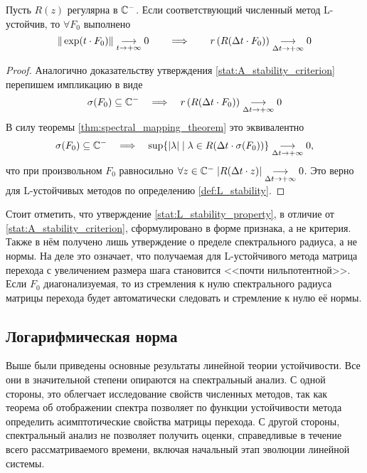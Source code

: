 \begin{statement}
    \label{stat:L_stability_property}
    Пусть $ R(z) $ регулярна в $ \mathbb{C}^- $.
    Если соответствующий численный метод L-устойчив, то $ \forall F_0 $ выполнено
    \[
        \| \exp(t \cdot F_0) \| \underset{t \to +\infty}{\longrightarrow} 0 \qquad \Longrightarrow \qquad r \left( R(\Delta t \cdot F_0) \right) \underset{\Delta t \to +\infty}{\longrightarrow} 0
    \]
\end{statement}

\begin{proof}
    Аналогично доказательству утверждения \ref{stat:A_stability_criterion} перепишем импликацию в виде
    \[
        \sigma(F_0) \subseteq \mathbb{C}^- \quad \Longrightarrow \quad r \left( R(\Delta t \cdot F_0) \right) \underset{\Delta t \to +\infty}{\longrightarrow} 0
    \]
    В силу теоремы \ref{thm:spectral_mapping_theorem} это эквивалентно
    \[
        \sigma(F_0) \subseteq \mathbb{C}^- \quad \Longrightarrow \quad \sup \{ |\lambda| \mid \lambda \in R(\Delta t \cdot \sigma(F_0)) \} \underset{\Delta t \to +\infty}{\longrightarrow} 0,
    \]
    что при произвольном $ F_0 $ равносильно $ \forall z \in \mathbb{C}^- \; | R(\Delta t \cdot z) | \underset{\Delta t \to +\infty}{\longrightarrow} 0 $.
    Это верно для L-устойчивых методов по определению \ref{def:L_stability}.
\end{proof}

Стоит отметить, что утверждение \ref{stat:L_stability_property}, в отличие от \ref{stat:A_stability_criterion}, сформулировано в форме признака, а не критерия.
Также в нём получено лишь утверждение о пределе спектрального радиуса, а не нормы.
На деле это означает, что получаемая для L-устойчивого метода матрица перехода с увеличением размера шага становится <<почти нильпотентной>>.
Если $ F_0 $ диагонализуемая, то из стремления к нулю спектрального радиуса матрицы перехода будет автоматически следовать и стремление к нулю её нормы.


\subsection{Логарифмическая норма}
\label{subsec:logarithmic_norm}

Выше были приведены основные результаты линейной теории устойчивости.
Все они в значительной степени опираются на спектральный анализ.
С одной стороны, это облегчает исследование свойств численных методов,
так как теорема об отображении спектра позволяет по функции устойчивости метода
определить асимптотические свойства матрицы перехода.
С другой стороны, спектральный анализ не позволяет получить оценки,
справедливые в течение всего рассматриваемого времени,
включая начальный этап эволюции линейной системы.

